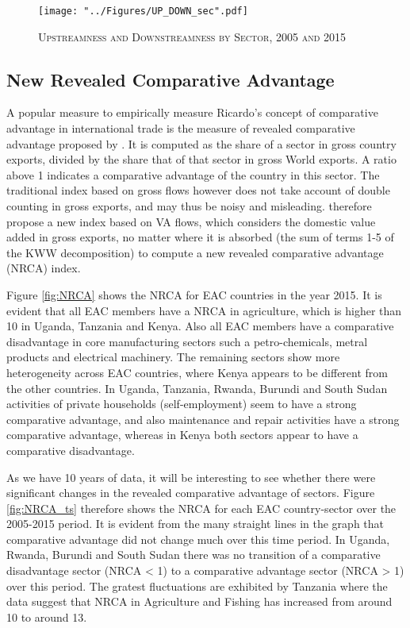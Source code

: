\documentclass[a4paper]{article}
\begin{document}
\begin{figure}[h!]
\centering
\caption{\label{fig:UP_DOWN_sec}\textsc{Upstreamness and Downstreamness by Sector, 2005 and 2015}}
\texttt{[image: "../Figures/UP\_DOWN\_sec".pdf]} %
\end{figure}
\FloatBarrier

\subsection{New Revealed Comparative Advantage}
A popular measure to empirically measure Ricardo's concept of comparative advantage in international trade is the measure of revealed comparative advantage proposed by \citet{balassa1965trade}. It is computed as the share of a sector in gross country exports, divided by the share that of that sector in gross World exports. A ratio above 1 indicates a comparative advantage of the country in this sector. The traditional index based on gross flows however does not take account of double counting in gross exports, and may thus be noisy and misleading. \citet{koopman2014tracing} therefore propose a new index based on VA flows, which considers the domestic value added in gross exports, no matter where it is absorbed (the sum of terms 1-5 of the KWW decomposition) to compute a new revealed comparative advantage (NRCA) index. \newline

Figure \ref{fig:NRCA} shows the NRCA for EAC countries in the year 2015. It is evident that all EAC members have a NRCA in agriculture, which is higher than 10 in Uganda, Tanzania and Kenya. Also all EAC members have a comparative disadvantage in core manufacturing sectors such a petro-chemicals, metral products and electrical machinery. The remaining sectors show more heterogeneity across EAC countries, where Kenya appears to be different from the other countries. In Uganda, Tanzania, Rwanda, Burundi and South Sudan activities of private households (self-employment) seem to have a strong comparative advantage, and also maintenance and repair activities have a strong comparative advantage, whereas in Kenya both sectors appear to have a comparative disadvantage. \newline

As we have 10 years of data, it will be interesting to see whether there were significant changes in the revealed comparative advantage of sectors. Figure \ref{fig:NRCA_ts} therefore shows the NRCA for each EAC country-sector over the 2005-2015 period. It is evident from the many straight lines in the graph that comparative advantage did not change much over this time period. In Uganda, Rwanda, Burundi and South Sudan there was no transition of a comparative disadvantage sector (NRCA < 1) to a comparative advantage sector (NRCA > 1) over this period. The gratest fluctuations are exhibited by Tanzania where the data suggest that NRCA in Agriculture and Fishing has increased from around 10 to around 13. 
\end{document}
